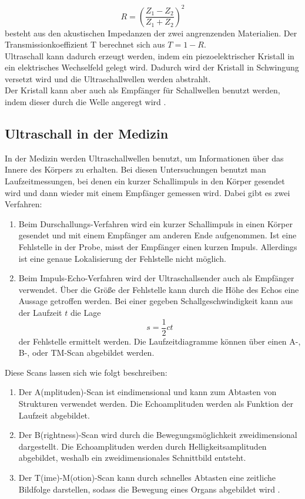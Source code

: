 \begin{equation*}
  R=\left(\frac{Z_1-Z_2}{Z_1+Z_2}\right)^2
\end{equation*}
besteht aus den akustischen Impedanzen der zwei angrenzenden Materialien. Der Transmissionkoeffizient T berechnet sich aus $T=1-R$.\\
Ultraschall kann dadurch erzeugt werden, indem ein piezoelektrischer Kristall in ein elektrisches Wechselfeld gelegt wird. Dadurch wird der Kristall in Schwingung versetzt wird und die Ultraschallwellen werden abstrahlt. \\
Der Kristall kann aber auch als Empfänger für Schallwellen benutzt werden, indem dieser durch die Welle angeregt wird \cite{1}.

\subsection{Ultraschall in der Medizin}
In der Medizin werden Ultraschallwellen benutzt, um Informationen über das Innere des Körpers zu erhalten. Bei diesen Untersuchungen benutzt man Laufzeitmessungen, bei denen ein kurzer Schallimpuls in den Körper gesendet wird und dann wieder mit einem Empfänger gemessen wird. Dabei gibt es zwei Verfahren:\\
\begin{enumerate}[nosep,label=\textsc{\arabic*},leftmargin=*]
\item Beim Durschallungs-Verfahren wird ein kurzer Schallimpuls in einen Körper gesendet und mit einem Empfänger am anderen Ende aufgenommen. Ist eine Fehlstelle in der Probe, misst der Empfänger einen kurzen Impuls. Allerdings ist eine genaue Lokalisierung der Fehlstelle nicht möglich.
\item Beim Impuls-Echo-Verfahren wird der Ultraschallsender auch als Empfänger verwendet. Über die Größe der Fehlstelle kann durch die Höhe des Echos  eine Aussage getroffen werden. Bei einer gegeben Schallgeschwindigkeit kann aus der Laufzeit $t$ die Lage
\begin{equation*}
  s=\frac{1}{2}ct
\end{equation*}
der Fehlstelle ermittelt werden. Die Laufzeitdiagramme können über einen A-, B-, oder TM-Scan abgebildet werden.
\end{enumerate}
Diese Scans lassen sich wie folgt beschreiben:
\begin{enumerate}[nosep,label=\textsc{\arabic*},leftmargin=*]
\item Der A(mplituden)-Scan ist eindimensional und kann zum Abtasten von Strukturen verwendet werden. Die Echoamplituden werden als Funktion der Laufzeit abgebildet.
\item Der B(rightness)-Scan wird durch die Bewegungsmöglichkeit zweidimensional dargestellt. Die Echoamplituden werden durch Helligkeitsamplituden abgebildet, weshalb ein zweidimensionales Schnittbild entsteht. 
\item Der T(ime)-M(otion)-Scan kann durch schnelles Abtasten eine zeitliche Bildfolge darstellen, sodass die Bewegung eines Organs abgebildet wird \cite{1}. 
\end{enumerate}
